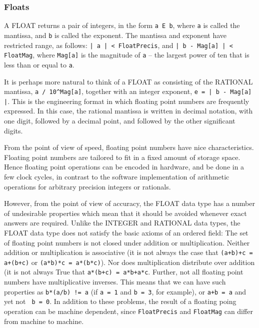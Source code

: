 \subsubsection{Floats}

A FLOAT returns a pair of integers, in the form \verb+a E b+, where
\verb+a+ is called the mantissa, and \verb+b+ is called the exponent.
The mantissa and exponent have restricted range, as follows:  
\verb+| a | < FloatPrecis+, and \verb+| b - Mag[a] | < FloatMag+, where
\verb+Mag[a]+ is the magnitude of \verb+a+ -- the largest power of ten 
that is less than or equal to \verb+a+.  

It is perhaps more natural to think of a FLOAT as consisting of the
RATIONAL mantissa, \verb+a / 10^Mag[a]+, together with an integer
exponent, \verb+e = | b - Mag[a] |+.  This is the engineering format
in which floating point numbers are frequently expressed.  In this
case, the rational mantissa is written in decimal notation, with one
digit, followed by a decimal point, and followed by the other
significant digits.

From the point of view of speed, floating point numbers have nice
characteristics.  Floating point numbers are tailored to fit in a
fixed amount of storage space.  Hence floating point operations can be
encoded in hardware, and be done in a few clock cycles, in contrast to
the software implementation of arithmetic operations for arbitrary
precision integers or rationals.  

However, from the point of view of accuracy, the FLOAT data type has a
number of undesirable properties which mean that it should be avoided
whenever exact answers are required.  Unlike the INTEGER and RATIONAL
data types, the FLOAT data type does not satisfy the basic axioms of
an ordered field: The set of floating point numbers is not closed
under addition or multiplication.  Neither addition or multiplication
is associative (it is not always the case that
\verb&(a+b)+c = a+(b+c)& or 
\verb+(a*b)*c = a*(b*c)+).  Nor does multiplication
distribute over addition (it is not always True that 
\verb&a*(b+c) = a*b+a*c&.  Further, not all floating point numbers have
multiplicative inverses.  This means that we can have such
properties as \verb+b*(a/b) != a+ (if \verb+a = 1+ and
\verb+b = 3+, for example), or \verb&a+b = a& and yet not \verb+ b = 0+.  In
addition to these problems, the result of a floating poing operation
can be machine dependent, since \verb+FloatPrecis+ and 
\verb+FloatMag+ can differ from machine to machine.

